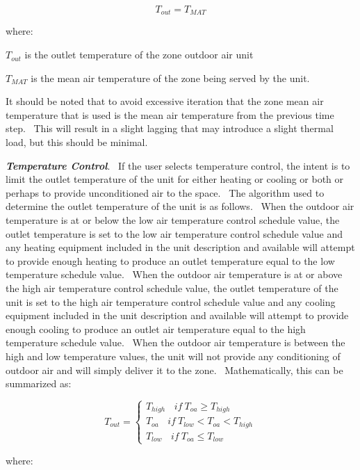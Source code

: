 \begin{equation}
{T_{out}} = {T_{MAT}}
\end{equation}

where:

\(T_{out}\) is the outlet temperature of the zone outdoor air unit

\(T_{MAT}\) is the mean air temperature of the zone being served by the unit.

It should be noted that to avoid excessive iteration that the zone mean air temperature that is used is the mean air temperature from the previous time step.~ This will result in a slight lagging that may introduce a slight thermal load, but this should be minimal.

\textbf{\emph{Temperature Control}}.~ If the user selects temperature control, the intent is to limit the outlet temperature of the unit for either heating or cooling or both or perhaps to provide unconditioned air to the space.~ The algorithm used to determine the outlet temperature of the unit is as follows.~ When the outdoor air temperature is at or below the low air temperature control schedule value, the outlet temperature is set to the low air temperature control schedule value and any heating equipment included in the unit description and available will attempt to provide enough heating to produce an outlet temperature equal to the low temperature schedule value.~ When the outdoor air temperature is at or above the high air temperature control schedule value, the outlet temperature of the unit is set to the high air temperature control schedule value and any cooling equipment included in the unit description and available will attempt to provide enough cooling to produce an outlet air temperature equal to the high temperature schedule value.~ When the outdoor air temperature is between the high and low temperature values, the unit will not provide any conditioning of outdoor air and will simply deliver it to the zone.~ Mathematically, this can be summarized as:

\begin{equation}
{T_{out}} = \left\{ {\begin{array}{ccc}{{T_{high}}~~~~if~{T_{oa}} \ge {T_{high}}}\\ {{T_{oa}}~~~~if~{T_{low}} < {T_{oa}} < {T_{high}}}\\ {{T_{low}}~~~~if~{T_{oa}} \le {T_{low}}}\end{array}} \right.
\end{equation}

where:

